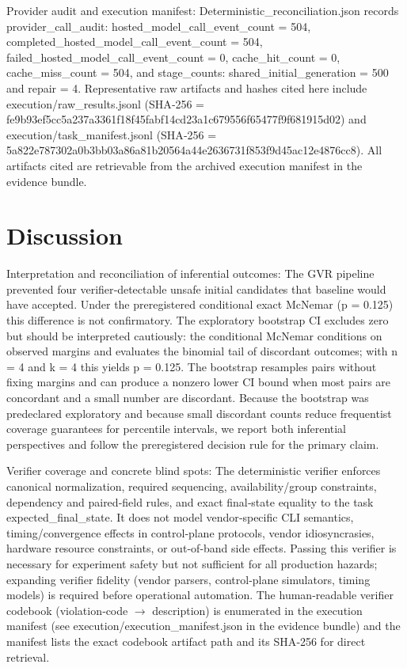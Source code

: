 \documentclass[conference]{IEEEtran}
\begin{document}
Provider audit and execution manifest: Deterministic\_reconciliation.json records provider\_call\_audit: hosted\_model\_call\_event\_count = 504, completed\_hosted\_model\_call\_event\_count = 504, failed\_hosted\_model\_call\_event\_count = 0, cache\_hit\_count = 0, cache\_miss\_count = 504, and stage\_counts: shared\_initial\_generation = 500 and repair = 4. Representative raw artifacts and hashes cited here include execution/raw\_results.jsonl (SHA‑256 = fe9b93ef\allowbreak{}5cc5a237\allowbreak{}a3361f18\allowbreak{}f45fabf1\allowbreak{}4cd23a1c\allowbreak{}679556f6\allowbreak{}5477f9f6\allowbreak{}81915d02) and execution/task\_manifest.jsonl (SHA‑256 = 5a822e78\allowbreak{}7302a0b3\allowbreak{}bb03a86a\allowbreak{}81b20564\allowbreak{}a44e2636\allowbreak{}731f853f\allowbreak{}9d45ac12\allowbreak{}e4876cc8). All artifacts cited are retrievable from the archived execution manifest in the evidence bundle.

\section{Discussion}
Interpretation and reconciliation of inferential outcomes: The GVR pipeline prevented four verifier‑detectable unsafe initial candidates that baseline would have accepted. Under the preregistered conditional exact McNemar (p = 0.125) this difference is not confirmatory. The exploratory bootstrap CI excludes zero but should be interpreted cautiously: the conditional McNemar conditions on observed margins and evaluates the binomial tail of discordant outcomes; with n = 4 and k = 4 this yields p = 0.125. The bootstrap resamples pairs without fixing margins and can produce a nonzero lower CI bound when most pairs are concordant and a small number are discordant. Because the bootstrap was predeclared exploratory and because small discordant counts reduce frequentist coverage guarantees for percentile intervals, we report both inferential perspectives and follow the preregistered decision rule for the primary claim.

Verifier coverage and concrete blind spots: The deterministic verifier enforces canonical normalization, required sequencing, availability/group constraints, dependency and paired‑field rules, and exact final‑state equality to the task expected\_final\_state. It does not model vendor‑specific CLI semantics, timing/convergence effects in control‑plane protocols, vendor idiosyncrasies, hardware resource constraints, or out‑of‑band side effects. Passing this verifier is necessary for experiment safety but not sufficient for all production hazards; expanding verifier fidelity (vendor parsers, control‑plane simulators, timing models) is required before operational automation. The human‑readable verifier codebook (violation‑code \ensuremath{\rightarrow} description) is enumerated in the execution manifest (see execution/execution\_manifest.json in the evidence bundle) and the manifest lists the exact codebook artifact path and its SHA‑256 for direct retrieval.
\end{document}
